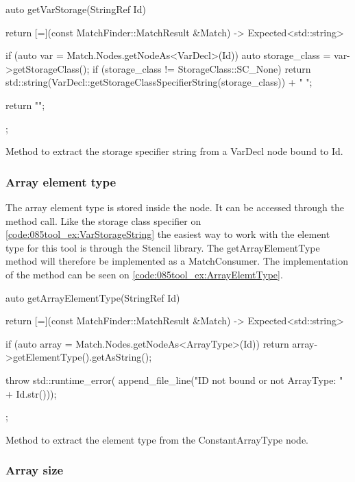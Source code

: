 \begin{listing}[H]
    \begin{cppcode}
auto getVarStorage(StringRef Id) {
    return [=](const MatchFinder::MatchResult &Match) -> Expected<std::string> {
        if (auto var = Match.Nodes.getNodeAs<VarDecl>(Id)) {
            auto storage_class = var->getStorageClass();
            if (storage_class != StorageClass::SC_None) {
               return std::string(VarDecl::getStorageClassSpecifierString(storage_class)) + " ";
            }
        }

        return "";
    };
}
    \end{cppcode}
    \caption{Method to extract the storage specifier string from a VarDecl node bound to Id.}
    \label{code:085tool_ex:VarStorageString}
\end{listing}

\subsubsection*{Array element type}

The array element type is stored inside the  node. It can be accessed through the  method call. Like the storage class specifier on \cref{code:085tool_ex:VarStorageString} the easiest way to work with the element type for this tool is through the Stencil library. The getArrayElementType method will therefore be implemented as a MatchConsumer. The implementation of the method can be seen on \cref{code:085tool_ex:ArrayElemtType}. 

\begin{listing}[H]
    \begin{cppcode}
auto getArrayElementType(StringRef Id) {
    return [=](const MatchFinder::MatchResult &Match) -> Expected<std::string> {
        if (auto array = Match.Nodes.getNodeAs<ArrayType>(Id)) {
            return array->getElementType().getAsString();
        }

        throw std::runtime_error(
			    append_file_line("ID not bound or not ArrayType: " + Id.str()));
    };
}
    \end{cppcode}
    \caption{Method to extract the element type from the ConstantArrayType node.}
    \label{code:085tool_ex:ArrayElemtType}
\end{listing}

\subsubsection*{Array size}

